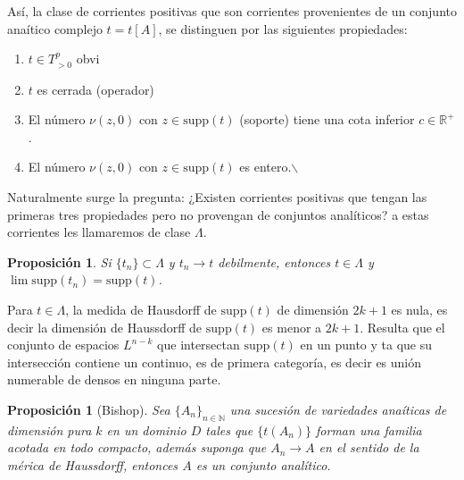 \documentclass[letterpaper]{article}
\newtheorem{prop}[teorema]{Proposici\'on}
\newcommand{\nat}{\ensuremath{ \mathbb N }}
\newcommand{\re}{\ensuremath{\mathbb R }}
\begin{document}
Así, la clase de corrientes positivas que son corrientes provenientes de un conjunto anaítico complejo \(t=t[A]\), se distinguen por las siguientes propiedades:
\begin{enumerate}
\item \(t\in T^p_{>0}\) obvi
\item \(t\) es cerrada (operador)
\item El número \(\nu(z,0)\) con \(z\in \mathrm{supp}(t)\) (soporte) tiene una cota inferior \(c\in\re^{+}\).
\item El número \(\nu(z,0)\) con \(z\in \mathrm{supp}(t)\) es entero.$\backslash$
\end{enumerate}
Naturalmente surge la pregunta: ¿Existen corrientes positivas que tengan las primeras tres propiedades pero no provengan de conjuntos analíticos? a estas corrientes les llamaremos de clase \(\Lambda\).
\begin{prop}
Si \(\{t_n\}\subset\Lambda\) y \(t_n\rightarrow t\) debilmente, entonces \(t\in\Lambda\) y \(\lim \mathrm{supp}(t_n)=\mathrm{supp}(t)\).
\end{prop}
Para \(t\in\Lambda\), la medida de Hausdorff de \(\mathrm{supp}(t)\) de dimensión \(2k+1\) es nula, es decir la dimensión de Haussdorff de \(\mathrm{supp}(t)\) es menor a \(2k+1\). Resulta que el conjunto de espacios \(L^{n-k}\) que intersectan \(\mathrm{supp}(t)\) en un punto y ta que su intersección contiene un continuo, es de primera categoría, es decir es unión numerable de densos en ninguna parte.
\begin{prop}[Bishop]
Sea \(\{A_n\}_{n\in\nat}\) una sucesión de variedades anaíticas de dimensión pura \(k\) en un dominio \(D\) tales que \(\{t(A_n)\}\) forman una familia acotada en todo compacto, además suponga que \(A_n\rightarrow A\) en el sentido de la mérica de Haussdorff, entonces \(A\) es un conjunto analítico.
\end{prop}
\end{document}
